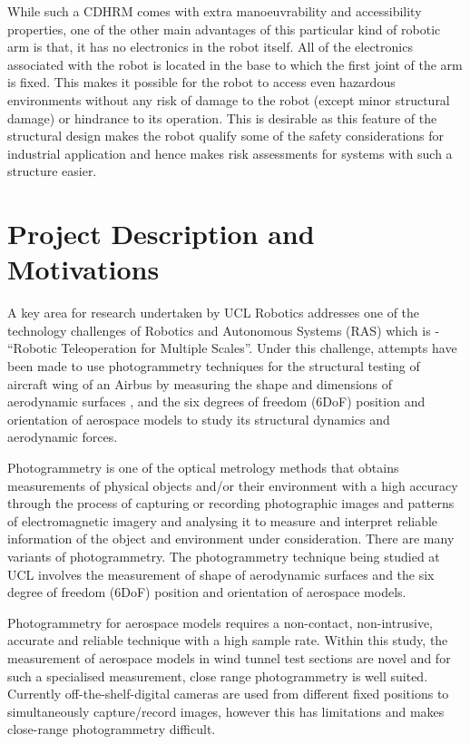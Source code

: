 \documentclass[a4paper,12pt]{report}
\begin{document}
While such a CDHRM comes with extra manoeuvrability and accessibility properties, one of the other main advantages of this particular kind of robotic arm is that, it has no electronics in the robot itself. All of the electronics associated with the robot is located in the base to which the first joint of the arm is fixed. This makes it possible for the robot to access even hazardous environments without any risk of damage to the robot (except minor structural damage) or hindrance to its operation. This is desirable as this feature of the structural design makes the robot qualify some of the safety considerations for industrial application and hence makes risk assessments for systems with such a structure easier. 

\section{Project Description and Motivations}

A key area for research undertaken by UCL Robotics addresses one of the technology challenges of Robotics and Autonomous Systems (RAS) which is - “Robotic Teleoperation for Multiple Scales”. Under this challenge, attempts have been made to use photogrammetry techniques for the structural testing of aircraft wing of an Airbus by measuring the shape and dimensions of aerodynamic surfaces \cite{shortis2016photogrammetric}, and the six degrees of freedom (6DoF) position and orientation of aerospace models to study its structural dynamics and aerodynamic forces.

Photogrammetry is one of the optical metrology methods that obtains measurements of physical objects and/or their environment with a high accuracy through the process of capturing or recording photographic images and patterns of electromagnetic imagery and analysing it to measure and interpret reliable information of the object and environment under consideration. There are many variants of photogrammetry. The photogrammetry technique being studied at UCL involves the measurement of shape of aerodynamic surfaces and the six degree of freedom (6DoF) position and orientation of aerospace models.

Photogrammetry for aerospace models requires a non-contact, non-intrusive, accurate and reliable technique with a high sample rate. Within this study, the measurement of aerospace models in wind tunnel test sections are novel and for such a specialised measurement, close range photogrammetry is well suited. Currently off-the-shelf-digital cameras are used from different fixed positions to simultaneously capture/record images, however this has limitations and makes close-range photogrammetry difficult.
\end{document}
